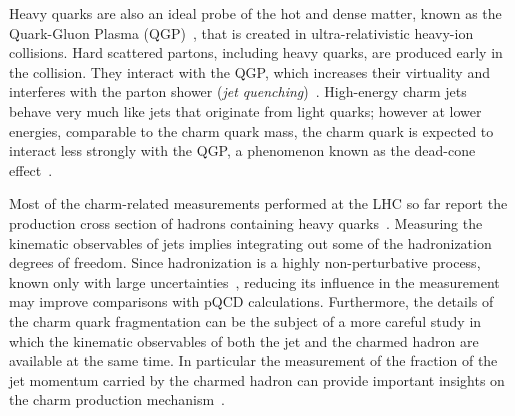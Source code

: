 \documentclass[a4paper]{jpconf}
\begin{document}
Heavy quarks are also an ideal probe of the hot and dense matter, 
known as the Quark-Gluon Plasma (QGP)~\cite{STAR:2005a, PHENIX:2005a, ALICE:2010b}, 
that is created in ultra-relativistic heavy-ion collisions. 
Hard scattered partons, including heavy quarks, are produced early in the collision. They interact with the QGP, which increases their virtuality and interferes with the
parton shower (\emph{jet quenching})~\cite{PHENIX:2008b, STAR:2006a, ALICE:2010d, CMS:2012b, ATLAS:2014d, ALICE:2015a}.
High-energy charm jets behave very much like jets that originate from light quarks; however at lower energies, comparable to the charm quark mass, the charm quark is expected
to interact less strongly with the QGP, a phenomenon known as the dead-cone effect~\cite{Dokshitzer:2001}.

Most of the charm-related measurements performed at the LHC so far report the production cross section of hadrons
containing heavy quarks~\cite{ALICE:2012d, ATLAS:2012e, LHCb:2013a, ATLAS:2016a, ALICE:2016b}.
Measuring the kinematic observables of jets implies integrating out some of the hadronization degrees of freedom. 
Since hadronization is a highly non-perturbative process, known only with large uncertainties~\cite{dEnterria:2014}, 
reducing its influence in the measurement may improve comparisons with pQCD calculations.
Furthermore, the details of the charm quark fragmentation can be the subject of a more careful study in which the kinematic observables 
of both the jet and the charmed hadron are available at the same time. In particular the measurement of the fraction of the jet momentum carried 
by the charmed hadron can provide important insights on the charm production mechanism~\cite{CDF:1990, UA1:1990, STAR:2009a, ATLAS:2012d}.
\end{document}
